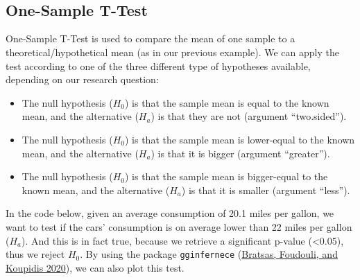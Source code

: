 \documentclass[
]{article}
\newenvironment{Shaded}{\begin{snugshade}}{\end{snugshade}}
\newcommand{\CommentTok}[1]{\textcolor[rgb]{0.56,0.35,0.01}{\textit{#1}}}
\newcommand{\FunctionTok}[1]{\textcolor[rgb]{0.13,0.29,0.53}{\textbf{#1}}}
\newcommand{\NormalTok}[1]{#1}
\newcommand{\SpecialCharTok}[1]{\textcolor[rgb]{0.81,0.36,0.00}{\textbf{#1}}}
\providecommand{\tightlist}{%
  \setlength{\itemsep}{0pt}\setlength{\parskip}{0pt}}
\begin{document}
\begin{Shaded}
\end{Shaded}

~

~

\hypertarget{one-sample-t-test}{%
\subsection{One-Sample T-Test}\label{one-sample-t-test}}

One-Sample T-Test is used to compare the mean of one sample to a
theoretical/hypothetical mean (as in our previous example). We can apply
the test according to one of the three different type of hypotheses
available, depending on our research question:

\begin{itemize}
\tightlist
\item
  The null hypothesis (\(H_0\)) is that the sample mean is equal to the
  known mean, and the alternative (\(H_a\)) is that they are not
  (argument ``two.sided'').
\item
  The null hypothesis (\(H_0\)) is that the sample mean is lower-equal
  to the known mean, and the alternative (\(H_a\)) is that it is bigger
  (argument ``greater'').
\item
  The null hypothesis (\(H_0\)) is that the sample mean is bigger-equal
  to the known mean, and the alternative (\(H_a\)) is that it is smaller
  (argument ``less'').
\end{itemize}

In the code below, given an average consumption of 20.1 miles per
gallon, we want to test if the cars' consumption is on average lower
than 22 miles per gallon (\(H_a\)). And this is in fact true, because we
retrieve a significant p-value (\textless0.05), thus we reject \(H_0\). By using
the package \texttt{gginfernece} (\protect\hyperlink{ref-bratsas2020}{Bratsas, Foudouli, and Koupidis 2020}), we can also plot this test.
\end{document}
